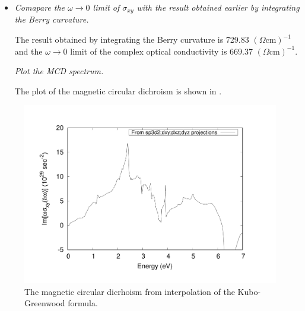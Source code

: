 \begin{itemize}
	\item {\it Comapare the $\omega \rightarrow 0$ limit of $\sigma_{xy}$ with the result obtained earlier by integrating the Berry curvature.}

	The result obtained by integrating the Berry curvature is 729.83 $(\Omega \mathrm{cm})^{-1}$ and the $\omega \rightarrow 0$ limit of the complex optical conductivity is $669.37$ $(\Omega \mathrm{cm})^{-1}$.

    {\it Plot the MCD spectrum.}

    The plot of the magnetic circular dichroism is shown in .
\end{itemize}

\begin{figure}[t!]
\centering
\includegraphics[width=0.7\columnwidth]{figure/example18/Fe_MCD_xy_125_sp3d2_projections.pdf}
\caption{The magnetic circular dicrhoism from interpolation of the Kubo-Greenwood formula.}
\label{fig18.5}
\end{figure}
\clearpage
